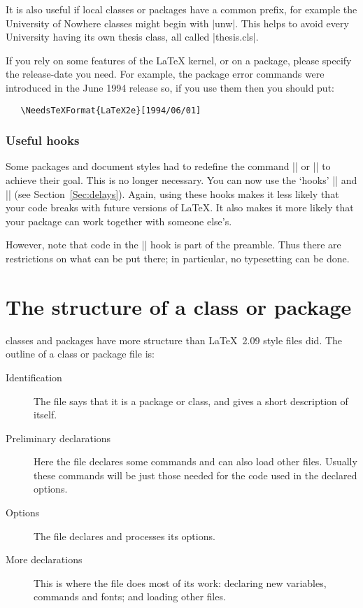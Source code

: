 \documentclass{ltxguide}[1995/11/28]
\begin{document}
It is also useful if local classes or packages have a common prefix,
for example the University of Nowhere classes might begin with |unw|.
This helps to avoid every University having its own thesis class, all
called |thesis.cls|.

If you rely on some features of the \LaTeX{} kernel, or on a package,
please specify the release-date you need.  For example, the package
error commands were introduced in the June 1994 release so, if you use
them then you should put:
\begin{verbatim}
   \NeedsTeXFormat{LaTeX2e}[1994/06/01]
\end{verbatim}

\subsubsection{Useful hooks}

Some packages and document styles had to redefine the command
|\document| or |\enddocument| to achieve their goal.  This is no
longer necessary. You can now use the `hooks' |\AtBeginDocument| and
|\AtEndDocument| (see Section~\ref{Sec:delays}).  Again, using these
hooks makes it less likely that your code breaks with future versions
of \LaTeX{}. It also makes it more likely that your package can work
together with someone else's.

However, note that code in the |\AtBeginDocument| hook is part of the
preamble.  Thus there are restrictions on what can be put there; in
particular, no typesetting can be done.

\section{The structure of a class or package}
\label{Sec:structure}

\LaTeXe{} classes and packages have more structure than \LaTeX~2.09
style files did.  The outline of a class or package file is:
\begin{description}
\item[Identification] The file says that it is a \LaTeXe{} package or
   class, and gives a short description of itself.
\item[Preliminary declarations]
   Here the file declares some commands and can also load
   other files.  Usually these commands will be just those needed for
   the code used in the declared options.
\item[Options] The file declares and processes its options.
\item[More declarations] This is where the file does most of its work:
   declaring new variables, commands and fonts; and loading other files.
\end{description}
\end{document}
